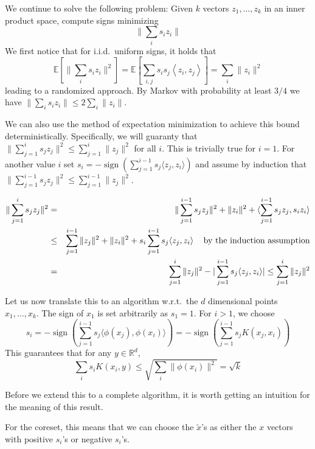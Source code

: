 \documentclass{article} %
\newcommand{\ip}[1]{\left \langle #1 \right \rangle}
\newcommand{\R}{\mathbb{R}}
\newcommand{\E}{\mathbb{E}}
\begin{document}
We continue to solve the following problem: Given $k$ vectors $z_1,\ldots,z_k$ in an inner product space, compute signs minimizing 
$$\| \sum_i s_i z_i \| $$
We first notice that for i.i.d.\ uniform signs, it holds that
$$\E[\| \sum_i s_i z_i \|^2] = \E[\sum_{i,j} s_i s_j \ip{z_i, z_j}] = \sum_i \|z_i\|^2 $$
leading to a randomized approach. By Markov with probability at least $3/4$ we have $\| \sum_i s_i z_i \| \le 2\sum_i \|z_i\|$.

We can also use the method of expectation minimization to achieve this bound deterministically.
Specifically, we will guaranty that $\| \sum_{j=1}^i s_j z_j \|^2 \le \sum_{j=1}^i \|z_j\|^2$ for all $i$.
This is trivially true for $i=1$. 
For another value $i$ set $s_i = -\operatorname{sign} (\sum_{j=1}^{i-1}s_j \langle z_j, z_i \rangle)$ 
and  assume by induction that $\| \sum_{j=1}^{i-1} s_j z_j\|^2 \le \sum_{j=1}^{i-1} \|z_j\|^2$.

\begin{eqnarray*}
\| \sum_{j=1}^{i}s_j z_j\|^2 &=& \|\sum_{j=1}^{i-1}s_j z_j\|^2 + \|z_i\|^2 + \langle \sum_{j=1}^{i-1}s_j z_j, s_i z_i\rangle \\
&\le& \sum_{j=1}^{i-1} \|z_j\|^2 + \|z_i\|^2 + s_i \sum_{j=1}^{i-1}s_j \langle  z_j,  z_i\rangle \mbox{\;\;\; by the induction assumption}\\ 
&=& \sum_{j=1}^{i} \|z_j\|^2 - |\sum_{j=1}^{i-1}s_j \langle  z_j,  z_i\rangle| \le \sum_{j=1}^{i} \|z_j\|^2
\end{eqnarray*}


Let us now translate this to an algorithm w.r.t.\ the $d$ dimensional points $x_1,\ldots, x_k$. 
The sign of $x_1$ is set arbitrarily as $s_1=1$. For $i>1$, we choose 
$$ s_i = -\operatorname{sign} (\sum_{j=1}^{i-1}s_j \langle \phi(x_j), \phi(x_i) \rangle) = -\operatorname{sign} (\sum_{j=1}^{i-1}s_j  K(x_j, x_i)) $$
This guarantees that for any $y \in \R^d$,
$$ \sum_i s_i K(x_i, y) \leq \sqrt{ \sum_i \|\phi(x_i)\|^2 } = \sqrt{k} $$

Before we extend this to a complete algorithm, it is worth getting an intuition for the meaning of this result.

For the coreset, this means that we can choose the $\tilde{x}$'s as either the $x$ vectors with positive $s_i$'s or negative $s_i$'s.
\end{document}
